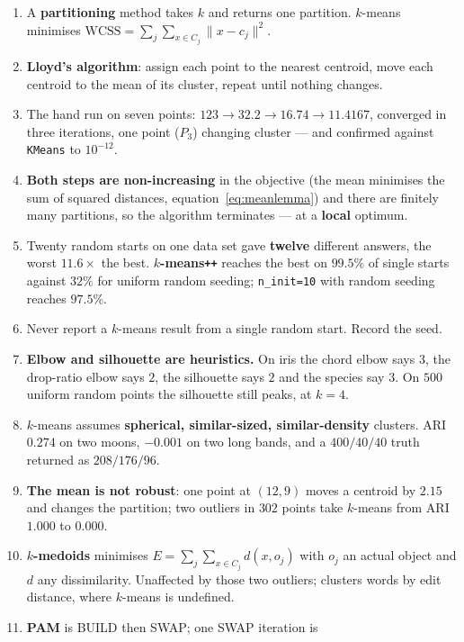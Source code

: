 \documentclass[11pt]{article}
\begin{document}
\begin{enumerate}[leftmargin=*]
  \item A \textbf{partitioning} method takes $k$ and returns one partition.
    $k$-means minimises
    $\mathrm{WCSS} = \sum_j\sum_{x \in C_j}\lVert x - c_j\rVert^2$.
  \item \textbf{Lloyd's algorithm}: assign each point to the nearest
    centroid, move each centroid to the mean of its cluster, repeat until
    nothing changes.
  \item The hand run on seven points: $123 \to 32.2 \to 16.74 \to 11.4167$,
    converged in three iterations, one point ($P_3$) changing cluster ---
    and confirmed against \texttt{KMeans} to $10^{-12}$.
  \item \textbf{Both steps are non-increasing} in the objective (the mean
    minimises the sum of squared distances, equation~\eqref{eq:meanlemma})
    and there are finitely many partitions, so the algorithm terminates ---
    at a \textbf{local} optimum.
  \item Twenty random starts on one data set gave \textbf{twelve} different
    answers, the worst $11.6\times$ the best.
    \textbf{$k$-means\texttt{++}} reaches the best on $99.5\%$ of single
    starts against $32\%$ for uniform random seeding; \texttt{n\_init=10}
    with random seeding reaches $97.5\%$.
  \item Never report a $k$-means result from a single random start. Record
    the seed.
  \item \textbf{Elbow and silhouette are heuristics.} On iris the chord
    elbow says $3$, the drop-ratio elbow says $2$, the silhouette says $2$
    and the species say $3$. On $500$ uniform random points the silhouette
    still peaks, at $k = 4$.
  \item $k$-means assumes \textbf{spherical, similar-sized, similar-density}
    clusters. ARI $0.274$ on two moons, $-0.001$ on two long bands, and a
    $400/40/40$ truth returned as $208/176/96$.
  \item \textbf{The mean is not robust}: one point at $(12,9)$ moves a
    centroid by $2.15$ and changes the partition; two outliers in $302$
    points take $k$-means from ARI $1.000$ to $0.000$.
  \item \textbf{$k$-medoids} minimises $E = \sum_j\sum_{x \in C_j} d(x,o_j)$
    with $o_j$ an actual object and $d$ any dissimilarity. Unaffected by
    those two outliers; clusters words by edit distance, where $k$-means is
    undefined.
  \item \textbf{PAM} is BUILD then SWAP; one SWAP iteration is

\end{enumerate}
\end{document}
